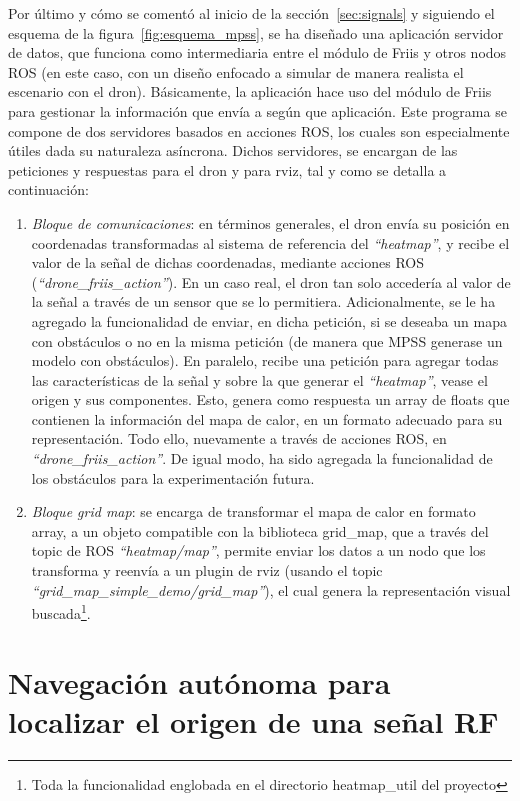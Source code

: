 Por último y cómo se comentó al inicio de la sección~\ref{sec:signals} y siguiendo el esquema de la figura~\ref{fig:esquema_mpss}, se ha diseñado una aplicación servidor de datos, que funciona como intermediaria entre el módulo de Friis y otros nodos \ac{ROS} (en este caso, con un diseño enfocado a simular de manera realista el escenario con el dron). Básicamente, la aplicación hace uso del módulo de Friis para gestionar la información que envía a según que aplicación. Este programa se compone de dos servidores basados en acciones \ac{ROS}, los cuales son especialmente útiles dada su naturaleza asíncrona. Dichos servidores, se encargan de las peticiones y respuestas para el dron y para rviz, tal y como se detalla a continuación:

\begin{enumerate}
	\item \emph{Bloque de comunicaciones}: en términos generales, el dron envía su posición en coordenadas transformadas al sistema de referencia del \emph{``heatmap''}, y recibe el valor de la señal de dichas coordenadas, mediante acciones \ac{ROS} (\emph{``drone\_friis\_action''}). En un caso real, el dron tan solo accedería al valor de la señal a través de un sensor que se lo permitiera. Adicionalmente, se le ha agregado la funcionalidad de enviar, en dicha petición, si se deseaba un mapa con obstáculos o no en la misma petición (de manera que \ac{MPSS} generase un modelo con obstáculos). En paralelo, recibe una petición para agregar todas las características de la señal y sobre la que generar el \emph{``heatmap''}, vease el origen y sus componentes. Esto, genera como respuesta un array de floats que contienen la información del mapa de calor, en un formato adecuado para su representación. Todo ello, nuevamente a través de acciones \ac{ROS}, en \emph{``drone\_friis\_action''}. De igual modo, ha sido agregada la funcionalidad de los obstáculos para la experimentación futura.
	\item \emph{Bloque grid map}: se encarga de transformar el mapa de calor en formato array, a un objeto compatible con la biblioteca grid\_map, que a través del topic de \ac{ROS} \emph{``heatmap/map''}, permite enviar los datos a un nodo que los transforma y reenvía a un plugin de rviz (usando el topic \emph{``grid\_map\_simple\_demo/grid\_map''}), el cual genera la representación visual buscada\footnote[4]{Toda la funcionalidad englobada en el directorio heatmap\_util del proyecto}.
\end{enumerate}

\section{Navegación autónoma para localizar el origen de una señal \ac{RF}}
\label{sec:signal_follow}

